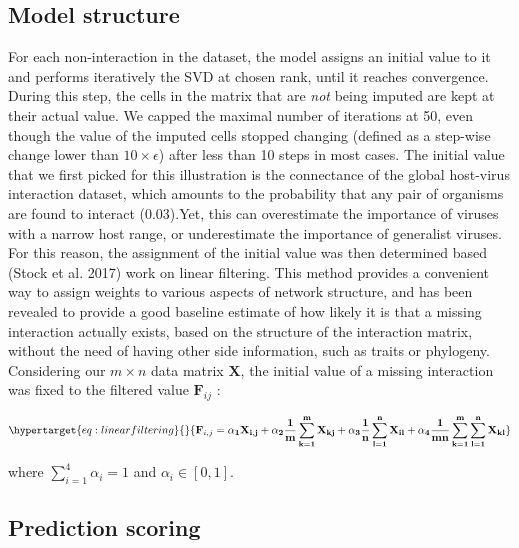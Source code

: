 \documentclass[11pt]{article}
\begin{document}
\hypertarget{model-structure}{%
\subsection{Model structure}\label{model-structure}}

For each non-interaction in the dataset, the model assigns an initial
value to it and performs iteratively the SVD at chosen rank, until it
reaches convergence. During this step, the cells in the matrix that are
\emph{not} being imputed are kept at their actual value. We capped the
maximal number of iterations at 50, even though the value of the imputed
cells stopped changing (defined as a step-wise change lower than
\(10\times \epsilon\)) after less than 10 steps in most cases. The
initial value that we first picked for this illustration is the
connectance of the global host-virus interaction dataset, which amounts
to the probability that any pair of organisms are found to interact
(0.03).Yet, this can overestimate the importance of viruses with a
narrow host range, or underestimate the importance of generalist
viruses. For this reason, the assignment of the initial value was then
determined based (Stock et al. 2017) work on linear filtering. This
method provides a convenient way to assign weights to various aspects of
network structure, and has been revealed to provide a good baseline
estimate of how likely it is that a missing interaction actually exists,
based on the structure of the interaction matrix, without the need of
having other side information, such as traits or phylogeny. Considering
our \(m \times n\) data matrix \(\mathbf{X}\), the initial value of a
missing interaction was fixed to the filtered value \(\mathbf{F}_{ij}\)
:

\begin{equation}\protect\hypertarget{eq:linearfiltering}{}{\mathbf{F}_{i,j} =  \mathbf{\alpha_{1}X_{i,j}+\alpha_{2}\frac{1}{m}\sum_{k=1}^m X_{kj} + \alpha_{3}\frac{1}{n}\sum_{l=1}^n X_{il} + \alpha_{4}\frac{1}{mn}\sum_{k=1}^m\sum_{l=1}^n X_{kl} }}\label{eq:linearfiltering}\end{equation}

where \(\sum\limits_{i=1}^4 \alpha_{i} = 1\) and
\(\alpha_{i} \in [0,1]\).

\hypertarget{prediction-scoring}{%
\subsection{Prediction scoring}\label{prediction-scoring}}
\end{document}
